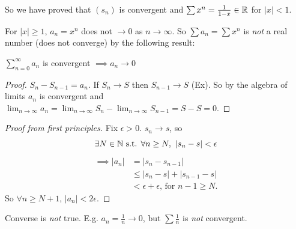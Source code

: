 \documentclass[10pt,twoside]{scrartcl}
\begin{document}
So we have proved that $(s_n)$ is convergent and $\sum x^n = \frac{1}{1-x} \in\mathbb{R}$ for $|x| < 1$. 

For $|x| \geq 1$, $a_n = x^n$ does not $\to 0$ as $n \to \infty$. So $\sum a_n = \sum x^n$ is \emph{not} a real number (does not converge) by the following result:\\


\begin{theorem}
$\sum_{n=0}^\infty a_n$ is convergent $\implies a_n \to 0$	
\end{theorem}

\begin{proof}
$S_n - S_{n-1} = a_n$. If $S_n \to S$ then $S_{n-1} \to S$ (Ex). So by the algebra of limits $a_n$ is convergent and $\lim_{n\to \infty} a_n = \lim_{n\to\infty} S_n - \lim_{n\to \infty} S_{n-1} = S - S = 0$.	
\end{proof}

\begin{proof}[Proof from first principles]
Fix $\epsilon >0$. $s_n \to s$, so 
\[\exists N\iN \text{ s.t. } \forall n \geq N,~|s_n - s| < \epsilon\vspace*{-10pt}\]
\begin{align*}
\implies |a_n| &= |s_n - s_{n-1}| \\
&\leq |s_n - s| + |s_{n-1} - s| \\ 
&< \epsilon + \epsilon \text{, for } n-1 \geq N.	
\end{align*}
So $\forall n \geq N+1$, $|a_n| < 2\epsilon$. 
\end{proof}\vspace*{5pt}

\begin{remark}
Converse is \emph{not} true. E.g. $a_n = \frac{1}{n} \to 0$, but $\sum \frac{1}{n}$ is \emph{not} convergent. 	
\end{remark}\vspace*{5pt}
\end{document}
